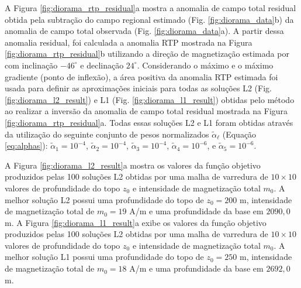 A Figura \ref{fig:diorama_rtp_residual}a mostra a anomalia de campo total residual obtida pela subtração do campo regional estimado (Fig. \ref{fig:diorama_data}b)
da anomalia de campo total observada (Fig. \ref{fig:diorama_data}a).
A partir dessa anomalia residual, foi calculada a anomalia RTP mostrada na Figura \ref{fig:diorama_rtp_residual}b utilizando a direção de magnetização estimada por \citet{zhang-2018} com inclinação $-46^{\circ}$ e declinação $24^{\circ}$.
Considerando o máximo e o máximo gradiente (ponto de inflexão), a área positiva da anomalia RTP estimada foi usada para definir as aproximações iniciais para todas as soluções L2 (Fig. \ref{fig:diorama_l2_result}) e L1 
(Fig. \ref{fig:diorama_l1_result}) obtidas pelo método ao realizar a inversão da anomalia de campo total residual mostrada na Figura \ref{fig:diorama_rtp_residual}a.
Todas essas soluções L2 e L1 foram obtidas através da utilização do seguinte conjunto de pesos normalizados $\tilde{\alpha}_{\ell}$ (Equação \ref{eq:alphas}):
$\tilde{\alpha}_{1} = 10^{-4}$, $\tilde{\alpha}_{2} = 10^{-4}$, 
$\tilde{\alpha}_{3} = 10^{-4}$, $\tilde{\alpha}_{4} = 10^{-6}$, e
$\tilde{\alpha}_{5} = 10^{-6}$.

A Figura \ref{fig:diorama_l2_result}a mostra os valores da função objetivo produzidos pelas 100 soluções L2 obtidas por uma malha de varredura de $10 \times 10$ valores de profundidade do topo $z_{0}$ e intensidade de magnetização total $m_{0}$.
A melhor solução L2 possui uma profundidade do topo de $z_{0} = 200$ m, intensidade de magnetização total de $m_{0} = 19$ A/m e uma profundidade da base em $2090,0$ m.
A Figura \ref{fig:diorama_l1_result}a exibe os valores da função objetivo produzidos pelas 100 soluções L2 obtidas por uma malha de varredura de $10 \times 10$ valores de profundidade do topo $z_{0}$ e intensidade de magnetização total $m_{0}$.
A melhor solução L1 possui uma profundidade do topo de $z_{0} = 250$ m, intensidade de magnetização total de $m_{0} = 18$ A/m e uma profundidade da base em $2692,0$ m.

